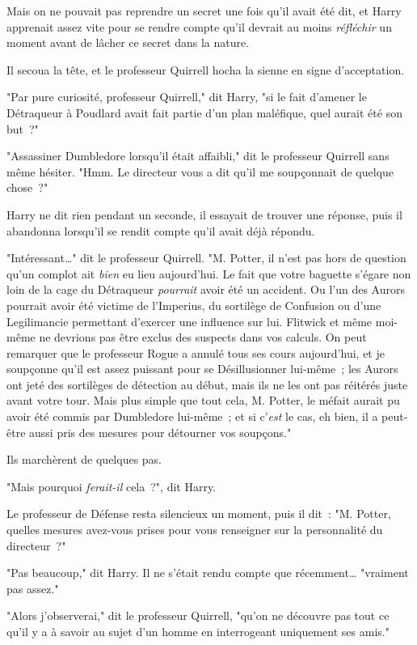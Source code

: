 Mais on ne pouvait pas reprendre un secret une fois qu'il avait été dit, et Harry apprenait assez vite pour se rendre compte qu'il devrait au moins \emph{réfléchir} un moment avant de lâcher ce secret dans la nature.

Il secoua la tête, et le professeur Quirrell hocha la sienne en signe d'acceptation.

"Par pure curiosité, professeur Quirrell," dit Harry, "si le fait d'amener le Détraqueur à Poudlard avait fait partie d'un plan maléfique, quel aurait été son but~?"

"Assassiner Dumbledore lorsqu'il était affaibli," dit le professeur Quirrell sans même hésiter. "Hmm. Le directeur vous a dit qu'il me soupçonnait de quelque chose~?"

Harry ne dit rien pendant un seconde, il essayait de trouver une réponse, puis il abandonna lorsqu'il se rendit compte qu'il avait déjà répondu.

"Intéressant…" dit le professeur Quirrell. "M. Potter, il n'est pas hors de question qu'un complot ait \emph{bien} eu lieu aujourd'hui. Le fait que votre baguette s'égare non loin de la cage du Détraqueur \emph{pourrait} avoir été un accident. Ou l'un des Aurors pourrait avoir été victime de l'Imperius, du sortilège de Confusion ou d'une Legilimancie permettant d'exercer une influence sur lui. Flitwick et même moi-même ne devrions pas être exclus des suspects dans vos calculs. On peut remarquer que le professeur Rogue a annulé tous ses cours aujourd'hui, et je soupçonne qu'il est assez puissant pour se Désillusionner lui-même~; les Aurors ont jeté des sortilèges de détection au début, mais ils ne les ont pas réitérés juste avant votre tour. Mais plus simple que tout cela, M. Potter, le méfait aurait pu avoir été commis par Dumbledore lui-même~; et si c'\emph{est} le cas, eh bien, il a peut-être aussi pris des mesures pour détourner vos soupçons."

Ils marchèrent de quelques pas.

"Mais pourquoi \emph{ferait-il} cela~?", dit Harry.

Le professeur de Défense resta silencieux un moment, puis il dit~: "M. Potter, quelles mesures avez-vous prises pour vous renseigner sur la personnalité du directeur~?"

"Pas beaucoup," dit Harry. Il ne s'était rendu compte que récemment… "vraiment pas assez."

"Alors j'observerai," dit le professeur Quirrell, "qu'on ne découvre pas tout ce qu'il y a à savoir au sujet d'un homme en interrogeant uniquement ses amis."

